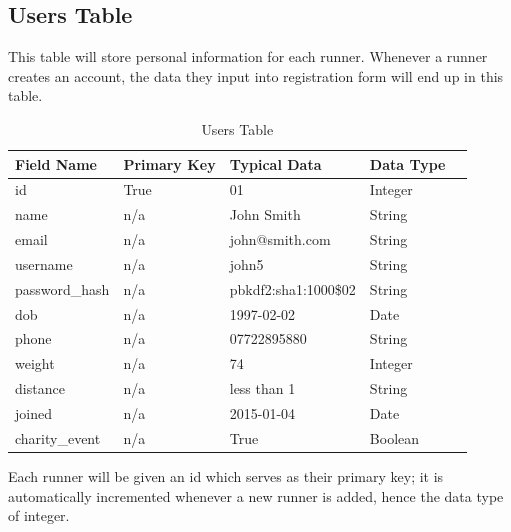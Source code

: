\documentclass{article}[12pt,a4paper]
\begin{document}
\subsection{Users Table}
This table will store personal information for each runner. Whenever a runner creates an account, the data they input into registration form will end up in this table.

\begin{table}[htbp]
\begin{tabular}{|l|l|l|l|l|}
\hline
\textbf{Field Name}     & \textbf{Primary Key} & \textbf{Typical Data} & \textbf{Data Type} \\ \hline
id             & True        & 01                   & Integer   \\ \hline
name           & n/a         & John Smith           & String    \\ \hline
email          & n/a         & john@smith.com       & String    \\ \hline
username       & n/a         & john5                & String    \\ \hline
password\_hash & n/a         & pbkdf2:sha1:1000\$02 & String    \\ \hline
dob            & n/a         & 1997-02-02           & Date      \\ \hline
phone          & n/a         & 07722895880          & String    \\ \hline
weight         & n/a         & 74                   & Integer   \\ \hline
distance       & n/a         & less than 1          & String    \\ \hline
joined         & n/a         & 2015-01-04           & Date      \\ \hline
charity\_event & n/a         & True                 & Boolean   \\ \hline
\end{tabular}
\caption{Users Table}
\end{table}

\noindent
Each runner will be given an id which serves as their primary key; it is automatically incremented whenever a new runner is added, hence the data type of integer. 
\end{document}
